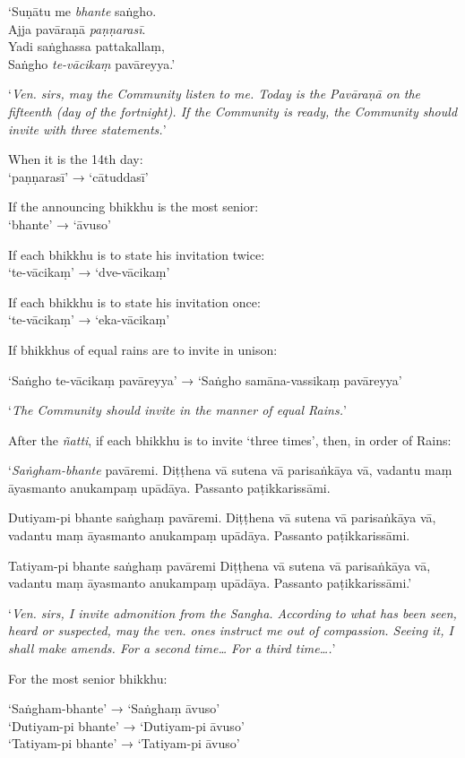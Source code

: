 ‘Suṇātu me \emph{bhante} saṅgho.\\
Ajja pavāraṇā \emph{paṇṇarasī}.\\
Yadi saṅghassa pattakallaṃ,\\
Saṅgho \emph{te-vācikaṃ} pavāreyya.’

‘\emph{Ven. sirs, may the Community listen to me. Today is the Pavāraṇā on the
  fifteenth (day of the fortnight). If the Community is ready, the Community
  should invite with three statements.}’


When it is the 14th day:\\
‘paṇṇarasī’ → ‘cātuddasī’

If the announcing bhikkhu is the most senior:\\
‘bhante’ → ‘āvuso’

If each bhikkhu is to state his invitation twice:\\
‘te-vācikaṃ’ → ‘dve-vācikaṃ’

If each bhikkhu is to state his invitation once:\\
‘te-vācikaṃ’ → ‘eka-vācikaṃ’

If bhikkhus of equal rains are to invite in unison:

‘Saṅgho te-vācikaṃ pavāreyya’ → ‘Saṅgho samāna-vassikaṃ pavāreyya’

‘\emph{The Community should invite in the manner of equal Rains.}’

After the \emph{ñatti}, if each bhikkhu is to invite ‘three times’, then, in
order of Rains:

‘\emph{Saṅgham-bhante} pavāremi. Diṭṭhena vā sutena vā parisaṅkāya vā, vadantu
maṃ āyasmanto anukampaṃ upādāya. Passanto paṭikkarissāmi.

Dutiyam-pi bhante saṅghaṃ pavāremi. Diṭṭhena vā sutena vā parisaṅkāya vā,
vadantu maṃ āyasmanto anukampaṃ upādāya. Passanto paṭikkarissāmi.

Tatiyam-pi bhante saṅghaṃ pavāremi Diṭṭhena vā sutena vā parisaṅkāya vā, vadantu
maṃ āyasmanto anukampaṃ upādāya. Passanto paṭikkarissāmi.’

‘\emph{Ven. sirs, I invite admonition from the Sangha. According to what has
  been seen, heard or suspected, may the ven. ones instruct me out of
  compassion. Seeing it, I shall make amends. For a second time… For a third
  time….}’

For the most senior bhikkhu:

‘Saṅgham-bhante’ → ‘Saṅghaṃ āvuso’\\
‘Dutiyam-pi bhante’ → ‘Dutiyam-pi āvuso’\\
‘Tatiyam-pi bhante’ → ‘Tatiyam-pi āvuso’

